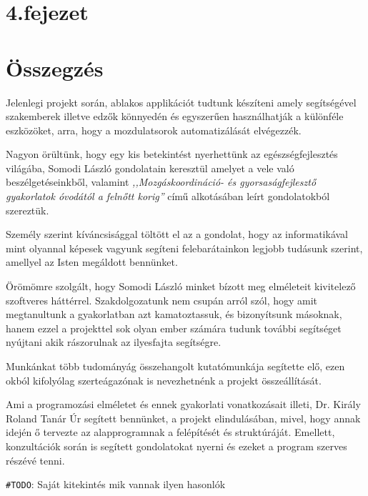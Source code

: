 \documentclass[tocnopagenum]{thesis-ekf}
\theoremstyle{definition}
\theoremstyle{remark}
\begin{document}
	\chapter*{4.fejezet}

	\chapter*{Összegzés}
	Jelenlegi projekt során, ablakos applikációt tudtunk készíteni amely segítségével szakemberek illetve edzők könnyedén és egyszerűen használhatják a különféle eszközöket, arra, hogy a mozdulatsorok automatizálását elvégezzék.

	Nagyon örültünk, hogy egy kis betekintést nyerhettünk az egészségfejlesztés világába, Somodi László gondolatain keresztül amelyet a vele való beszélgetéseinkből, valamint \textit{,,Mozgáskoordináció- és gyorsaságfejlesztő gyakorlatok óvodától a felnőtt korig''} című alkotásában leírt gondolatokból szereztük.
	
	Személy szerint kíváncsisággal töltött el az a gondolat, hogy az informatikával mint olyannal képesek vagyunk segíteni felebarátainkon legjobb tudásunk szerint, amellyel az Isten megáldott bennünket.
	
	Örömömre szolgált, hogy Somodi László minket bízott meg elméleteit kivitelező szoftveres háttérrel. Szakdolgozatunk nem csupán arról szól, hogy amit megtanultunk a gyakorlatban azt kamatoztassuk, és bizonyítsunk másoknak, hanem ezzel a projekttel sok olyan ember számára tudunk további segítséget nyújtani akik rászorulnak az ilyesfajta segítségre.
	
	Munkánkat több tudományág összehangolt kutatómunkája segítette elő, ezen okból kifolyólag szerteágazónak is nevezhetnénk a projekt összeállítását.
	
	Ami a programozási elméletet és ennek gyakorlati vonatkozásait illeti, Dr. Király Roland Tanár Úr segített bennünket, a projekt elindulásában, mivel, hogy annak idején ő tervezte az alapprogramnak a felépítését és struktúráját. Emellett, konzultációk során is segített gondolatokat nyerni és ezeket a program szerves részévé tenni.

\verb*|#TODO|: Saját kitekintés mik vannak ilyen hasonlók
	
\end{document}
